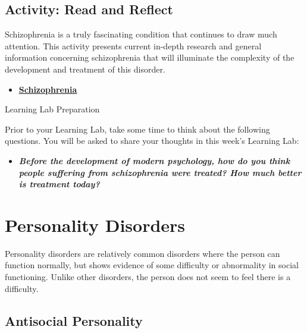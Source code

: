 \documentclass[
]{book}
\providecommand{\tightlist}{%
  \setlength{\itemsep}{0pt}\setlength{\parskip}{0pt}}
\begin{document}
\hypertarget{activity-read-and-reflect-17}{%
\subsection*{Activity: Read and Reflect}\label{activity-read-and-reflect-17}}

\begin{reflect}
Schizophrenia is a truly fascinating condition that continues to draw much attention. This activity presents current in-depth research and general information concerning schizophrenia that will illuminate the complexity of the development and treatment of this disorder.

\begin{itemize}
\tightlist
\item
  \href{http://schizophrenia.com/}{\textbf{Schizophrenia}}
\end{itemize}

{Learning Lab Preparation}

Prior to your Learning Lab, take some time to think about the following questions. You will be asked to share your thoughts in this week's Learning Lab:

\begin{itemize}
\tightlist
\item
  \textbf{\emph{Before the development of modern psychology, how do you think people suffering from schizophrenia were treated? How much better is treatment today?}}
\end{itemize}
\end{reflect}

\hypertarget{personality-disorders}{%
\section{Personality Disorders}\label{personality-disorders}}

Personality disorders are relatively common disorders where the person can function normally, but shows evidence of some difficulty or abnormality in social functioning. Unlike other disorders, the person does not seem to feel there is a difficulty.

\hypertarget{antisocial-personality}{%
\subsection*{Antisocial Personality}\label{antisocial-personality}}
\end{document}
